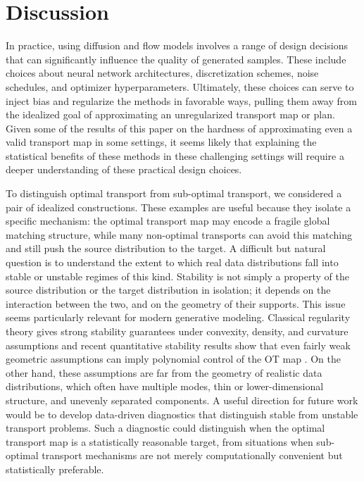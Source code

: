 \documentclass[11pt,twoside]{article}
\begin{document}
\section{Discussion}

In practice, using diffusion and flow models involves a range of design decisions that can significantly influence the quality of generated samples. These include choices about neural network architectures, discretization schemes, noise schedules, and optimizer hyperparameters. Ultimately, these choices can serve to inject bias and regularize the methods in favorable ways, pulling them away from the idealized goal of approximating an unregularized transport map or plan. Given some of the results of this paper on the hardness of approximating even a valid transport map in some settings, it seems likely that explaining the statistical benefits of these methods in these challenging settings will require a deeper understanding of these practical design choices.

To distinguish optimal transport from sub-optimal transport, we considered a pair of idealized constructions. These examples are useful because they isolate a specific mechanism: the optimal transport map may encode a fragile global matching structure, while many non-optimal transports can avoid this matching and still push the source distribution to the target. A difficult but natural question is to understand the extent to which real data distributions fall into stable or unstable regimes of this kind. Stability is not simply a property of the source distribution or the target distribution in isolation; it depends on the interaction between the two, and on the geometry of their supports.
This issue seems particularly relevant for modern generative modeling. Classical regularity theory gives strong stability guarantees under convexity, density, and curvature assumptions and recent quantitative stability results show that even fairly weak geometric assumptions can imply polynomial control of the OT map \cite{letrouit2024gluing,merigot2020,delalande2023,letrouit2025lectures}. On the other hand, these assumptions are far from the geometry of realistic data distributions, which often have multiple modes, thin or lower-dimensional structure, and unevenly separated components. A useful direction for future work would be to develop data-driven diagnostics that distinguish stable from unstable transport problems. Such a diagnostic could distinguish when the optimal transport map is a statistically reasonable target, from situations when sub-optimal transport mechanisms are not merely computationally convenient but statistically preferable.
\end{document}
